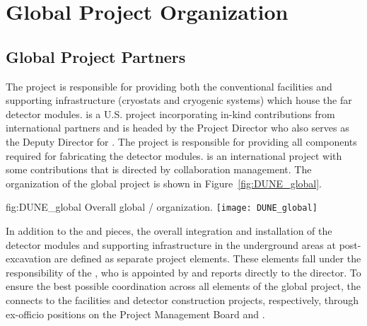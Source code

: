 \chapter{Global Project Organization}
\label{vl:tc-global}

\section{Global Project Partners}
\label{sec:partners}

The  project is responsible for providing both the conventional
facilities and supporting infrastructure (cryostats and cryogenic
systems) which house the  far detector modules.  is a
U.S.  project incorporating in-kind contributions from
international partners and is headed by the  Project Director who
also serves as the \fnal Deputy Director for .  The 
project is responsible for providing all components required for
fabricating the detector modules.  is an international project
with some  contributions that is directed by 
collaboration management. The organization of the global project 
is shown in Figure~\ref{fig:DUNE_global}.
\begin{dunefigure}{fig:DUNE_global}
  {Overall global  / organization.}
  \texttt{[image: DUNE\_global]}
\end{dunefigure}

In addition to the  and  pieces, the overall
integration and installation of the detector modules and supporting
 infrastructure in the underground areas at 
post-excavation are defined as separate project elements.  These
elements fall under the responsibility of the , who is
appointed by and reports directly to the \fnal director.  To ensure
the best possible coordination across all elements of the global
project, the  connects to the facilities and detector
construction projects, respectively, through ex-officio positions on
the  Project Management Board and 
.

